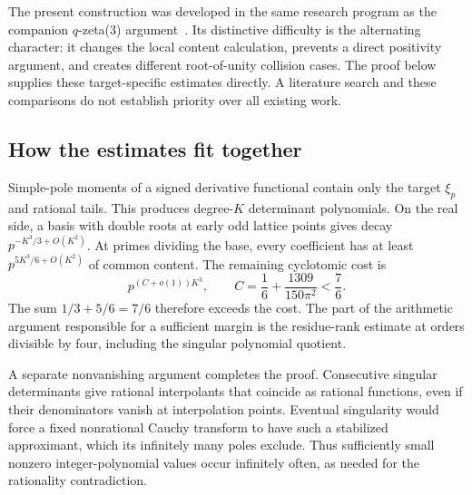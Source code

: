 The present construction was developed in the same research program as the companion $q$-zeta(3) argument~\cite{CompanionZeta}. Its distinctive difficulty is the alternating character: it changes the local content calculation, prevents a direct positivity argument, and creates different root-of-unity collision cases. The proof below supplies these target-specific estimates directly. A literature search and these comparisons do not establish priority over all existing work.

\subsection{How the estimates fit together}
Simple-pole moments of a signed derivative functional contain only the target $\xi_p$ and rational tails. This produces degree-$K$ determinant polynomials. On the real side, a basis with double roots at early odd lattice points gives decay $p^{-K^3/3+O(K^2)}$. At primes dividing the base, every coefficient has at least $p^{5K^3/6+O(K^2)}$ of common content. The remaining cyclotomic cost is
\begin{equation*}
 p^{(C+o(1))K^3},\qquad C=\frac16+\frac{1309}{150\pi^2}<\frac76.
\end{equation*}
The sum $1/3+5/6=7/6$ therefore exceeds the cost. The part of the arithmetic argument responsible for a sufficient margin is the residue-rank estimate at orders divisible by four, including the singular polynomial quotient.

A separate nonvanishing argument completes the proof. Consecutive singular determinants give rational interpolants that coincide as rational functions, even if their denominators vanish at interpolation points. Eventual singularity would force a fixed nonrational Cauchy transform to have such a stabilized approximant, which its infinitely many poles exclude. Thus sufficiently small nonzero integer-polynomial values occur infinitely often, as needed for the rationality contradiction.
